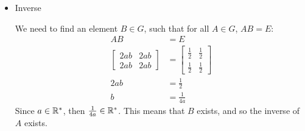 \begin{enumerate}
\begin{itemize}
        \item Inverse

        We need to find an element \(B\in G\), such that for all \(A\in G\), \(AB = E\):
        \begin{align*}
            AB &= E \\
            \begin{bmatrix}
                2ab & 2ab \\ 2ab & 2ab
            \end{bmatrix} &= \begin{bmatrix}
                \frac{1}{2} & \frac{1}{2} \\ \frac{1}{2} & \frac{1}{2}
            \end{bmatrix} \\
            2ab &= \frac{1}{2} \\
            b &= \frac{1}{4a}
        \end{align*}
        Since \(a\in\mathbb{R}^*\), then \(\frac{1}{4a}\in\mathbb{R}^*\). This means that \(B\) exists, and so the inverse of \(A\) exists.
    \end{itemize}
\end{enumerate}
